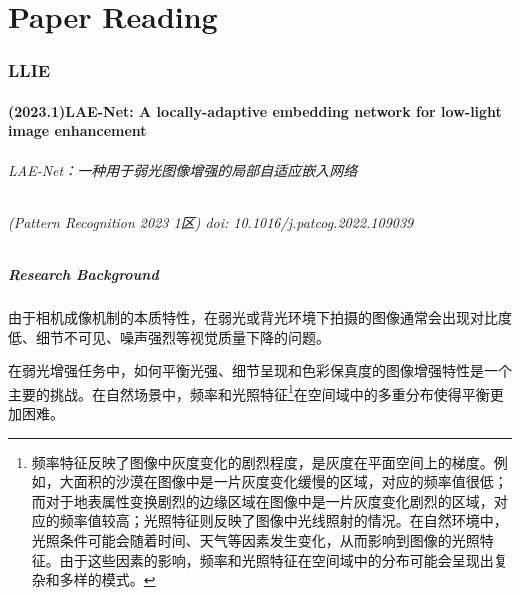 \documentclass[a4paper, 10pt]{article}
\begin{document}

	
	\part{Paper Reading}
	
	\section{LLIE}
		
		\subsection{(2023.1)LAE-Net: A locally-adaptive embedding network for low-light image enhancement}
		
		\paragraph{LAE-Net：一种用于弱光图像增强的局部自适应嵌入网络}
		
		\paragraph{(Pattern Recognition 2023 1区) doi: 10.1016/j.patcog.2022.109039}
		
			\subsubsection{Research Background}
			
			由于相机成像机制的本质特性，在弱光或背光环境下拍摄的图像通常会出现对比度低、细节不可见、噪声强烈等视觉质量下降的问题。
			
			在弱光增强任务中，如何平衡光强、细节呈现和色彩保真度的图像增强特性是一个主要的挑战。在自然场景中，频率和光照特征\footnote{频率特征反映了图像中灰度变化的剧烈程度，是灰度在平面空间上的梯度。例如，大面积的沙漠在图像中是一片灰度变化缓慢的区域，对应的频率值很低；而对于地表属性变换剧烈的边缘区域在图像中是一片灰度变化剧烈的区域，对应的频率值较高；光照特征则反映了图像中光线照射的情况。在自然环境中，光照条件可能会随着时间、天气等因素发生变化，从而影响到图像的光照特征。由于这些因素的影响，频率和光照特征在空间域中的分布可能会呈现出复杂和多样的模式。}在空间域中的多重分布使得平衡更加困难。
			
\end{document}
